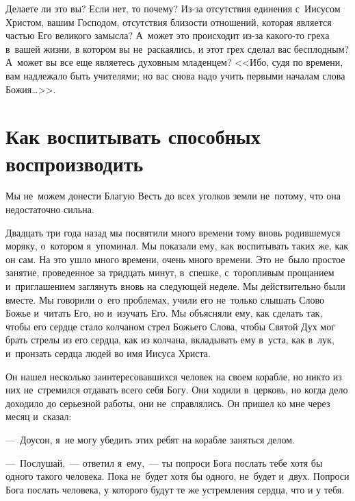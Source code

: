 \documentclass[12pt,article,a4paper,fittopage]{ncc}
\begin{document}
\begin{multicols}{2}
Делаете ли это вы? Если нет, то почему? Из-за отсутствия единения с~Иисусом Христом, вашим Господом, отсутствия близости отношений, которая является частью Его великого замысла? А~может это происходит из-за какого-то греха в~вашей жизни, в котором вы не~раскаялись, и этот грех сделал вас бесплодным? А~может вы все еще являетесь духовным младенцем? <<Ибо, судя по времени, вам надлежало быть учителями; но вас снова надо учить первыми началам слова Божия\ldots{}>>.

\pagestyle{lheadings}

\section*{Как воспитывать способных воспроизводить}

Мы не~можем донести Благую Весть до всех уголков земли не~потому, что она недостаточно сильна.

Двадцать три года назад мы посвятили много времени тому вновь родившемуся моряку, о~котором я~упоминал. Мы показали ему, как воспитывать таких же, как он сам. На это ушло много времени, очень много времени. Это не~было простое занятие, проведенное за тридцать минут, в~спешке, с~торопливым прощанием и~приглашением заглянуть вновь на следующей неделе. Мы действительно были вместе. Мы говорили о~его проблемах, учили его не~только слышать Слово Божье и~читать Его, но и~изучать Его. Мы объясняли ему, как сделать так, чтобы его сердце стало колчаном стрел Божьего Слова, чтобы Святой Дух мог брать стрелы из его сердца, как из колчана, вкладывать ему в~уста, как в~лук, и~пронзать сердца людей во имя Иисуса Христа.

Он нашел несколько заинтересовавшихся человек на своем корабле, но никто из них не~стремился отдавать всего себя Богу. Они ходили в~церковь, но когда дело доходило до серьезной работы, они не~справлялись. Он пришел ко мне через месяц и~сказал:

---~Доусон, я~не могу убедить этих ребят на корабле заняться делом.

---~Послушай,~--- ответил я~ему,~--- ты попроси Бога послать тебе хотя бы одного такого человека. Пока не~будет хотя бы одного, не~будет и~двух. Попроси Бога послать человека, у которого будут те же устремления сердца, что и у тебя.


\end{multicols}
\end{document}
